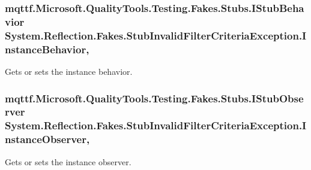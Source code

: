 \hypertarget{class_system_1_1_reflection_1_1_fakes_1_1_stub_invalid_filter_criteria_exception_abe93b3190d3458644d4b235e1ae5dfb7}{
\subsubsection[{Instance\-Behavior}]{\setlength{\rightskip}{0pt plus 5cm}mqttf.\-Microsoft.\-Quality\-Tools.\-Testing.\-Fakes.\-Stubs.\-I\-Stub\-Behavior System.\-Reflection.\-Fakes.\-Stub\-Invalid\-Filter\-Criteria\-Exception.\-Instance\-Behavior\hspace{0.3cm}{\ttfamily [get]}, {\ttfamily [set]}}}\label{class_system_1_1_reflection_1_1_fakes_1_1_stub_invalid_filter_criteria_exception_abe93b3190d3458644d4b235e1ae5dfb7}


Gets or sets the instance behavior.

\hypertarget{class_system_1_1_reflection_1_1_fakes_1_1_stub_invalid_filter_criteria_exception_a8177082e33b9c1c7f2d7f2d2659a0706}{
\subsubsection[{Instance\-Observer}]{\setlength{\rightskip}{0pt plus 5cm}mqttf.\-Microsoft.\-Quality\-Tools.\-Testing.\-Fakes.\-Stubs.\-I\-Stub\-Observer System.\-Reflection.\-Fakes.\-Stub\-Invalid\-Filter\-Criteria\-Exception.\-Instance\-Observer\hspace{0.3cm}{\ttfamily [get]}, {\ttfamily [set]}}}\label{class_system_1_1_reflection_1_1_fakes_1_1_stub_invalid_filter_criteria_exception_a8177082e33b9c1c7f2d7f2d2659a0706}


Gets or sets the instance observer.

